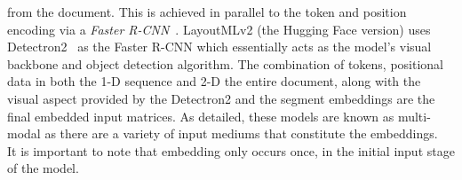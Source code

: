 from the document. This is achieved in parallel to the token and position encoding via a \emph{Faster R-CNN}~\autocite{FasterRCNNExplained2020}.
LayoutMLv2 (the Hugging Face version) uses Detectron2~\autocite{FacebookresearchDetectron22022} as the Faster R-CNN which essentially acts as the model's visual backbone and
object detection algorithm.
\bigbreak
The combination of tokens, positional data in both the 1-D sequence and 2-D the entire document, along with the visual aspect provided by the
Detectron2 and the segment embeddings are the final embedded input matrices. As detailed, these models are known as multi-modal as there
are a variety of input mediums that constitute the embeddings.\\
It is important to note that embedding only occurs once, in the initial input stage of the model.

